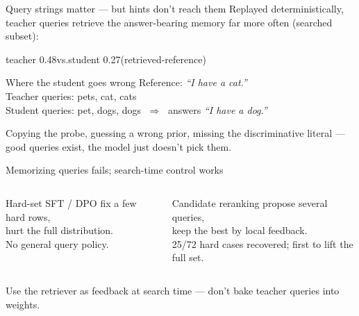\documentclass[10pt,aspectratio=169]{beamer}
\newcommand{\code}[1]{{\small\ttfamily #1}}
\begin{document}
\begin{frame}{Query strings matter --- but hints don't reach them}
  Replayed deterministically, \alert{teacher queries} retrieve the answer-bearing
  memory far more often (searched subset):
  \smallskip
  \begin{center}\small
    teacher \alert{0.48}\quad vs.\quad student \alert{0.27}\quad(retrieved-reference)
  \end{center}
  \vspace{0.4em}
  \begin{exampleblock}{Where the student goes wrong}
    Reference: \emph{``I have a cat.''}\\
    Teacher queries: \code{pets, cat, cats}\\
    Student queries: \code{pet, dogs, dogs} $\;\Rightarrow\;$ answers \emph{``I have a dog.''}
  \end{exampleblock}
  \smallskip
  Copying the probe, guessing a wrong prior, missing the discriminative literal ---
  good queries exist, the model just doesn't \alert{pick} them.
\end{frame}

\begin{frame}{Memorizing queries fails; search-time control works}
  \begin{columns}[T,onlytextwidth]
      \begin{block}{Hard-set SFT / DPO}
        fix a few hard rows,\\ \alert{hurt the full distribution}.\\[2pt]
        \footnotesize No general query policy.
      \end{block}
      \begin{alertblock}{Candidate reranking}
        propose several queries,\\ keep the best by \alert{local feedback}.\\[2pt]
        \footnotesize \alert{25/72} hard cases recovered; first to lift the full set.
      \end{alertblock}
  \end{columns}
  \vspace{1.2em}
  \begin{center}
    Use the retriever as feedback at \alert{search time} ---
    don't bake teacher queries into weights.
  \end{center}
\end{frame}
\end{document}
